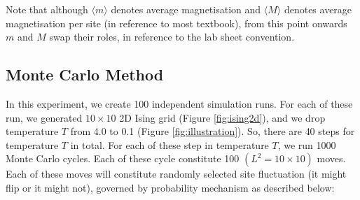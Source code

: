 \documentclass[a4paper]{article}
\numberwithin{equation}{section}
\begin{document}
Note that although $\langle m \rangle$ denotes average magnetisation and $\langle M \rangle$ denotes average magnetisation per site (in reference to most textbook), from this point onwards $m$ and $M$ swap their roles, in reference to the lab sheet convention.
\subsection{Monte Carlo Method \cite{lab}}
In this experiment, we create 100 independent simulation runs. For each of these run, we generated $10\times 10$ 2D Ising grid (Figure \ref{fig:ising2d}), and we drop temperature $T$ from 4.0 to 0.1 (Figure \ref{fig:illustration}). So, there are 40 steps for temperature $T$ in total. For each of these step in temperature $T$, we run 1000 Monte Carlo cycles. Each of these cycle constitute 100 $(L^2 = 10\times10)$ moves. Each of these moves will constitute randomly selected site fluctuation (it might flip or it might not), governed by probability mechanism as described below:
\end{document}
